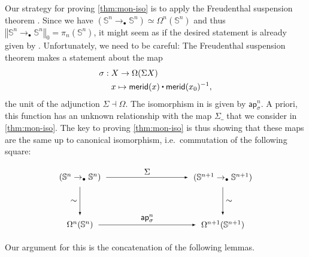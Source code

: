 \documentclass[11pt,a4paper,oneside,reqno]{amsart}
\theoremstyle{definition}
\theoremstyle{remark}
\newcommand{\sph}[1]{{\mathbb S}^{#1}}
\newcommand{\ct}{%
  \mathchoice{\mathbin{\raisebox{0.5ex}{$\displaystyle\centerdot$}}}%
             {\mathbin{\raisebox{0.5ex}{$\centerdot$}}}%
             {\mathbin{\raisebox{0.25ex}{$\scriptstyle\,\centerdot\,$}}}%
             {\mathbin{\raisebox{0.1ex}{$\scriptscriptstyle\,\centerdot\,$}}}
}
\newcommand{\trunc}[2]{\mathopen{}\left\Vert #2\right\Vert_{#1}\mathclose{}}
\newcommand{\pointedm}{\rightarrow_\bullet}
\begin{document}
Our strategy for proving \cref{thm:mon-iso} is to apply the
Freudenthal suspension theorem \cite[Thm 8.6.4]{HoTT}. 
Since we have $(\sph n \pointedm \sph n) \simeq \Omega^n(\sph n)$ and thus $\trunc 0 {\sph n \pointedm \sph n} = \pi_n(\sph n)$, it might seem as if 
the desired statement is already given by \cite[Cor 8.6.15]{HoTT}.
Unfortunately, we need to be careful: 
The Freudenthal suspension theorem makes a statement about the map
\begin{align}
 \sigma : \; &X \to \Omega(\Sigma X) \\
 &x \mapsto \mathsf{merid}(x) \ct \mathsf{merid}(x_0)^{-1},
\end{align}
the unit of the adjunction $\Sigma \dashv \Omega$.
The isomorphism in \cite[Cor 8.6.15]{HoTT}
is given by $\mathsf{ap}^n_\sigma$.
A priori, this function has an unknown relationship with the map $\Sigma \_$ that we consider in \cref{thm:mon-iso}.
The key to proving \cref{thm:mon-iso} is thus showing that these maps are the same up to canonical isomorphism, i.e.\ commutation of the following square:

\begin{equation} \label{eq:needs-to-commute}
\begin{tikzpicture}[x=6cm,y=-2cm,baseline=(current bounding box.center)]
 \tikzset{arrow/.style={shorten >=0.1cm,shorten <=.1cm,-latex}}
 \node (A) at (0,0) {$(\sph n \pointedm \sph n)$}; 
 \node (B) at (0,1) {$\Omega^n(\sph n)$}; 
 \node (C) at (1,1) {$\Omega^{n+1}(\sph {n+1})$}; 
 \node (D) at (1,0) {$(\sph {n+1} \pointedm \sph {n+1})$}; 

 \draw[arrow] (A) to node [left] {$\sim$} (B);
 \draw[arrow] (B) to node [above] {$\mathsf{ap}^n_\sigma$} (C);
 \draw[arrow] (D) to node [right] {$\sim$} (C);
 \draw[arrow] (A) to node [above] {$\Sigma$} (D);
\end{tikzpicture}
\end{equation}

Our argument for this is the concatenation of the following lemmas.
\end{document}
